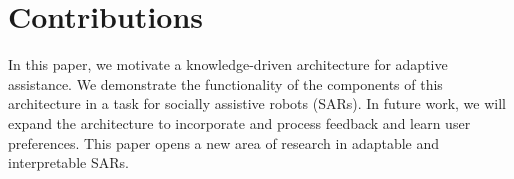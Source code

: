 \documentclass[letterpaper]{article} %
\begin{document}
\section{Contributions}

In this paper, we motivate a knowledge-driven architecture for adaptive assistance. We demonstrate the functionality of the components of this architecture in a task for socially assistive robots (SARs). In future work, we will expand the architecture to incorporate and process feedback and learn user preferences. This paper opens a new area of research in adaptable and interpretable SARs.



\end{document}
